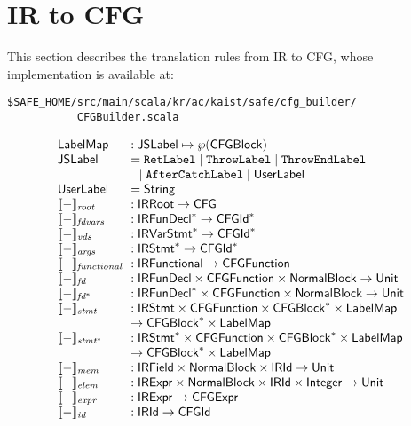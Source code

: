 \section{IR to CFG}
This section describes the \safe translation rules from IR to CFG,
whose implementation is available at:
\begin{verbatim}
$SAFE_HOME/src/main/scala/kr/ac/kaist/safe/cfg_builder/
           CFGBuilder.scala
\end{verbatim}

\[
\begin{array}{l@{~~}l}
\LabelMap &: \JSLabel \mapsto \powerset{\CFGBlock}\\
\JSLabel &= \RetLabel \mid \ThrowLabel \mid \ThrowEndLabel\\
& \ \ \mid \AfterCatchLabel \mid \UserLabel\\
\UserLabel &= \String\\
\transfun{-}_{\emph{root}} &: \IRRoot \rightarrow \CFG \\
\transfun{-}_{\emph{fdvars}} &: \IRFunDecl^{*} \rightarrow \CFGId^{*} \\
\transfun{-}_{\emph{vds}} &: \IRVarStmt^{*} \rightarrow \CFGId^{*} \\
\transfun{-}_{\emph{args}} &: \IRStmt^{*} \rightarrow \CFGId^{*} \\
\transfun{-}_{\emph{functional}} &: \IRFunctional \rightarrow \CFGFunction \\
\transfun{-}_{\emph{fd}} &: \IRFunDecl \times \CFGFunction \times \NormalBlock \rightarrow \Unit \\
\transfun{-}_{\emph{fd}^{*}} &: \IRFunDecl^{*} \times \CFGFunction \times \NormalBlock \rightarrow \Unit \\
\transfun{-}_{\emph{stmt}} &: \IRStmt \times \CFGFunction \times \CFGBlock^{*} \times \LabelMap\\
& \rightarrow \CFGBlock^{*} \times \LabelMap\\
\transfun{-}_{\emph{stmt}^{*}} &: \IRStmt^{*} \times \CFGFunction \times \CFGBlock^{*} \times \LabelMap\\
& \rightarrow \CFGBlock^{*} \times \LabelMap\\
\transfun{-}_{\emph{mem}} &: \IRField \times \NormalBlock \times \IRId \rightarrow \Unit \\
\transfun{-}_{\emph{elem}} &: \IRExpr \times \NormalBlock \times \IRId \times \Integer \rightarrow \Unit \\
\transfun{-}_{\emph{expr}} &: \IRExpr \rightarrow \CFGExpr \\
\transfun{-}_{\emph{id}} &: \IRId \rightarrow \CFGId \\
\end{array}
\]

